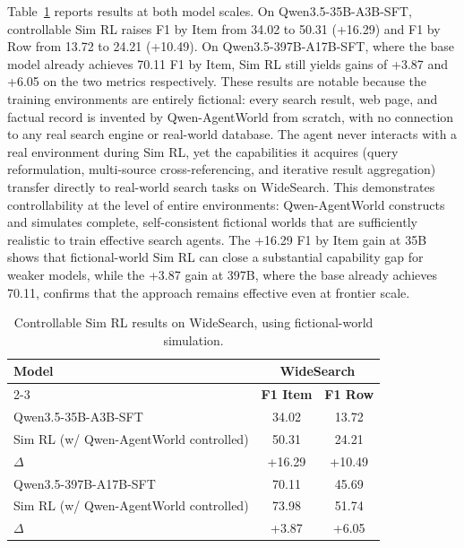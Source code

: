 \documentclass{llmxive}
\providecommand{\method}{Qwen-AgentWorld\xspace}
\begin{document}
Table~\ref{tab:controllable_simrl} reports results at both model scales.
On Qwen3.5-35B-A3B-SFT, controllable Sim RL raises F1 by Item from 34.02 to 50.31 (+16.29) and F1 by Row from 13.72 to 24.21 (+10.49).
On Qwen3.5-397B-A17B-SFT, where the base model already achieves 70.11 F1 by Item, Sim RL still yields gains of +3.87 and +6.05 on the two metrics respectively.
These results are notable because the training environments are entirely fictional: every search result, web page, and factual record is invented by \method from scratch, with no connection to any real search engine or real-world database.
The agent never interacts with a real environment during Sim RL, yet the capabilities it acquires (query reformulation, multi-source cross-referencing, and iterative result aggregation) transfer directly to real-world search tasks on WideSearch.
This demonstrates controllability at the level of entire environments: \method constructs and simulates complete, self-consistent fictional worlds that are sufficiently realistic to train effective search agents.
The +16.29 F1 by Item gain at 35B shows that fictional-world Sim RL can close a substantial capability gap for weaker models, while the +3.87 gain at 397B, where the base already achieves 70.11, confirms that the approach remains effective even at frontier scale.

\begin{table}[ht]
\centering
\small
\begin{tabular}{@{}l cc@{}}
\toprule
\multirow{2}{*}{\textbf{Model}} & \multicolumn{2}{c}{\textbf{WideSearch}} \\
\cmidrule(lr){2-3}
& \textbf{F1 Item} & \textbf{F1 Row} \\
\midrule
Qwen3.5-35B-A3B-SFT                          & 34.02 & 13.72 \\
\quad\quad Sim RL (w/ \method controlled) & 50.31 & 24.21 \\
\midrule
\quad\quad $\Delta$                           & +16.29 & +10.49 \\
\midrule
Qwen3.5-397B-A17B-SFT                        & 70.11 & 45.69 \\
\quad\quad Sim RL (w/ \method controlled) & 73.98 & 51.74 \\
\midrule
\quad\quad $\Delta$                           & +3.87 & +6.05 \\
\bottomrule
\end{tabular}
\caption{Controllable Sim RL results on WideSearch, using fictional-world simulation.}
\label{tab:controllable_simrl}
\end{table}
\end{document}

